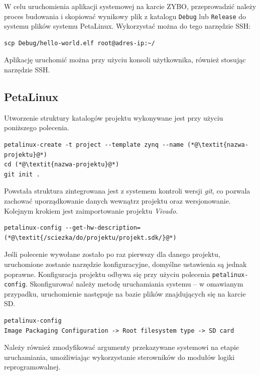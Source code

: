 W celu uruchomienia aplikacji systemowej na karcie ZYBO, przeprowadzić należy proces budowania i skopiować wynikowy plik z katalogu \texttt{Debug} lub \texttt{Release} do systemu plików systemu PetaLinux. 
Wykorzystać można do tego narzędzie SSH:

\begin{lstlisting}[breaklines=true]
scp Debug/hello-world.elf root@adres-ip:~/
\end{lstlisting}

Aplikację uruchomić można przy użyciu konsoli użytkownika, również stosując narzędzie SSH.

\subsection{PetaLinux}
\label{sec:petalinux-config}


Utworzenie struktury katalogów projektu wykonywane jest przy użyciu poniższego polecenia.

\begin{lstlisting}[breaklines=true]
petalinux-create -t project --template zynq --name (*@\textit{nazwa-projektu}@*)
cd (*@\textit{nazwa-projektu}@*)
git init .
\end{lstlisting}

Powstała struktura zintegrowana jest z systemem kontroli wersji \emph{git}, co pozwala zachować uporządkowanie danych wewnątrz projektu oraz wersjonowanie. 
Kolejnym krokiem jest zaimportowanie projektu \emph{Vivado}.

\begin{lstlisting}[breaklines=true]
petalinux-config --get-hw-description=(*@\textit{/sciezka/do/projektu/projekt.sdk/}@*)
\end{lstlisting}

Jeśli polecenie wywołane zostało po raz pierwszy dla danego projektu, uruchomione zostanie narzędzie konfiguracyjne, domyślne ustawienia są jednak poprawne.
Konfiguracja projektu odbywa się przy użyciu polecenia \texttt{petalinux-config}.
Skonfigurować należy metodę uruchamiania systemu -- w omawianym przypadku, uruchomienie następuje na bazie plików znajdujących się na karcie SD.
\begin{lstlisting}[breaklines=true]
petalinux-config
Image Packaging Configuration -> Root filesystem type -> SD card
\end{lstlisting}

Należy również zmodyfikować argumenty przekazywane systemowi na etapie uruchamiania, umożliwiając wykorzystanie sterowników do modułów logiki reprogramowalnej.

